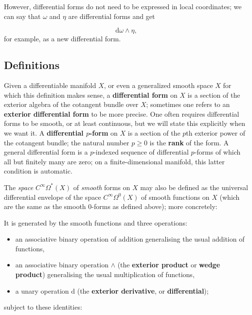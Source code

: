 \documentclass[preprint, 5p, 10pt]{elsarticle}
\theoremstyle{plain}
\begin{document}
However, differential forms do not need to be expressed in local coordinates; we can say that $\omega$ and $\eta$ are differential forms and get

\begin{displaymath}
\mathrm{d}\omega \wedge \eta ,
\end{displaymath}
for example, as a new differential form.

\hypertarget{definitions_5}{}\subsection*{{Definitions}}\label{definitions_5}

Given a differentiable manifold $X$, or even a generalized smooth space $X$ for which this definition makes sense, a \textbf{differential form} on $X$ is a section of the exterior algebra of the cotangent bundle over $X$; sometimes one refers to an \textbf{exterior differential form} to be more precise. One often requires differential forms to be smooth, or at least continuous, but we will state this explicitly when we want it. A \textbf{differential $p$-form} on $X$ is a section of the $p$th exterior power of the cotangent bundle; the natural number $p \geq 0$ is the \textbf{rank} of the form. A general differential form is a $p$-indexed sequence of differential $p$-forms of which all but finitely many are zero; on a finite-dimensional manifold, this latter condition is automatic.

The \emph{space} $C^\infty\Omega^*(X)$ of \emph{smooth} forms on $X$ may also be defined as the universal differential envelope of the space $C^\infty\Omega^0(X)$ of smooth functions on $X$ (which are the same as the smooth $0$-forms as defined above); more concretely:

It is generated by the smooth functions and three operations:

\begin{itemize}%
\item an associative binary operation of addition generalising the usual addition of functions,
\item an associative binary operation $\wedge$ (the \textbf{exterior product} or \textbf{wedge product}) generalising the usual multiplication of functions,
\item a unary operation $\mathrm{d}$ (the \textbf{exterior derivative}, or \textbf{differential});

\end{itemize}
subject to these identities:
\end{document}
